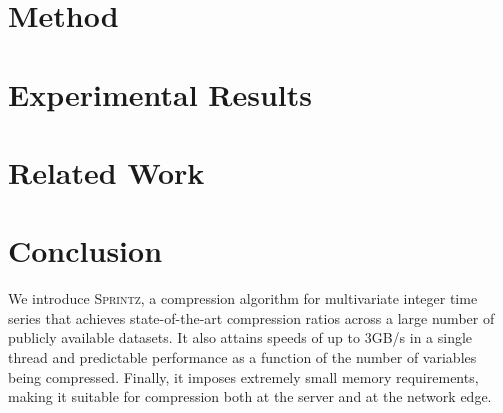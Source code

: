 \documentclass[acmlarge]{acmart}
\newcommand{\mine}{\textsc{Sprintz}}
\newcommand{\minesp}{\textsc{Sprintz}\text{ }}
\newcommand{\fire}{\textsc{Fire}\text{ }}
\begin{document}
\section{Method} \label{sec:method}



\section{Experimental Results} \label{sec:results}



\vspace{3mm}
\section{Related Work} \label{sec:relatedWork}



\section{Conclusion} \label{sec:conclusion}

We introduce \mine, a compression algorithm for multivariate integer time series that achieves state-of-the-art compression ratios across a large number of publicly available datasets. It also attains speeds of up to 3GB/s in a single thread and predictable performance as a function of the number of variables being compressed. Finally, it imposes extremely small memory requirements, making it suitable for compression both at the server and at the network edge. %

\end{document}
